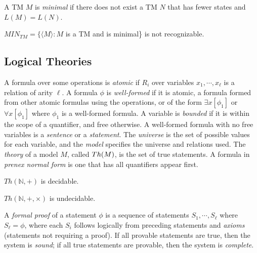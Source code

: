 \begin{definition}
A TM $M$ is \emph{minimal} if there does not exist a TM $N$ that has fewer states and $L(M) = L(N)$.
\end{definition}

\begin{theorem}
$MIN_{TM} = \{\langle M \rangle : M$ is a TM and is minimal\} is not recognizable.
\end{theorem}

\subsection{Logical Theories}

\begin{definition}
A formula over some operations is \emph{atomic} if $R_i$ over variables $x_1,\cdots,x_{\ell}$ is a relation of arity $\ell$. A formula $\phi$ is \emph{well-formed} if it is atomic, a formula formed from other atomic formulas using the operations, or of the form $\exists x[\phi_1]$ or $\forall x[\phi_1]$ where $\phi_1$ is a well-formed formula. A variable is \emph{bounded} if it is within the scope of a quantifier, and free otherwise. A well-formed formula with no free variables is a \emph{sentence} or a \emph{statement}. The \emph{universe} is the set of possible values for each variable, and the \emph{model} specifies the universe and relations used. The \emph{theory} of a model $M$, called ${\sc Th}(M)$, is the set of true statements. A formula in \emph{prenex normal form} is one that has all quantifiers appear first. 
\end{definition}

\begin{theorem}
$Th(\mathbb{N}, +)$ is decidable.
\end{theorem}

\begin{theorem}
$Th(\mathbb{N}, +, \times)$ is undecidable.
\end{theorem}

\begin{definition}
A \emph{formal proof} of a statement $\phi$ is a sequence of statements $S_1,\cdots,S_{\ell}$ where $S_{\ell} = \phi$, where each $S_i$ follows logically from preceding statements and \emph{axioms} (statements not requiring a proof). If all provable statements are true, then the system is \emph{sound}; if all true statements are provable, then the system is \emph{complete}.
\end{definition}

